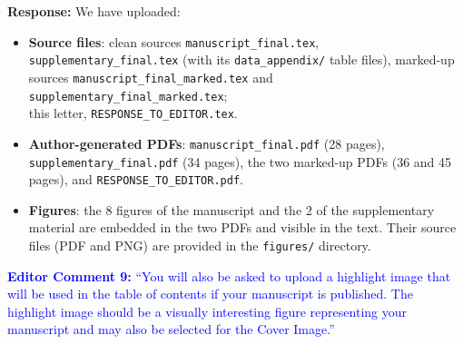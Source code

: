 \documentclass[11pt,a4paper]{article}
\newcommand{\brk}{\hspace{0pt}}
\begin{document}
\vspace{0.5em}

\noindent\textbf{Response:} We have uploaded:
\begin{itemize}
\item \textbf{Source files}: clean sources \texttt{manuscript\_final\brk.tex},
  \texttt{supplementary\_final\brk.tex} (with its \texttt{data\_appendix/} table files),
  marked-up sources \texttt{manuscript\_final\brk\_marked\brk.tex} and
  \texttt{supplementary\_final\brk\_marked\brk.tex};\\
  this letter, \texttt{RESPONSE\_TO\_EDITOR\brk.tex}.
\item \textbf{Author-generated PDFs}: \texttt{manuscript\_final\brk.pdf} (28 pages),
  \texttt{supplementary\_final\brk.pdf} (34 pages), the two marked-up PDFs
  (36 and 45 pages), and
  \texttt{RESPONSE\_TO\_EDITOR\brk.pdf}.
\item \textbf{Figures}: the 8 figures of the manuscript and the 2 of the
  supplementary material are embedded in the two PDFs and visible in the text.
  Their source files (PDF and PNG) are provided in the
  \texttt{figures/} directory.
\end{itemize}

\vspace{1em}

\noindent\textcolor{blue}{\textbf{Editor Comment 9:} ``You will also be asked
to upload a highlight image that will be used in the table of contents if your
manuscript is published. The highlight image should be a visually interesting
figure representing your manuscript and may also be selected for the Cover
Image.''}

\vspace{0.5em}
\end{document}
